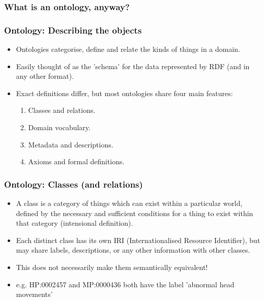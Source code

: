 \documentclass{beamer}
\begin{document}
\begin{frame}
\frametitle{What is an ontology, anyway?}


\end{frame}

\begin{frame}
\frametitle{Ontology: Describing the objects} \begin{itemize}
  \item Ontologies categorise, define and relate the kinds of things in a domain.
  \item Easily thought of as the 'schema' for the data represented by RDF (and
  in any other format).
  \item Exact definitions differ, but most ontologies share four main features:
  \begin{enumerate}
    \item Classes and relations.
    \item Domain vocabulary.
    \item Metadata and descriptions.
    \item Axioms and formal definitions.
  \end{enumerate}
\end{itemize}
\end{frame}

\begin{frame}
\frametitle{Ontology: Classes (and relations)}
\begin{itemize}
  \item A class is a category of things which can exist within a
  particular world, defined by the necessary and sufficient conditions for a
  thing to exist within that category (intensional definition).
  \item Each distinct class has its own IRI (Internationalised Resource
  Identifier), but may share labels, descriptions, or any other information with
  other classes.
  \item This does not necessarily make them semantically equivalent!
  \item e.g. HP:0002457 and MP:0000436 both have the label 'abnormal head
  movements'
\end{itemize}
\end{frame}
\end{document}
